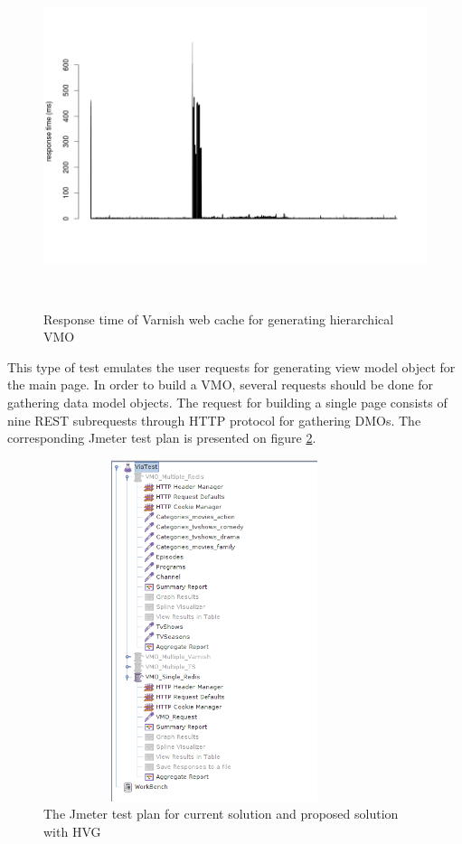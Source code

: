 \begin{figure}[h!]
    \centering
    \includegraphics[width=15cm,height=10cm,keepaspectratio]{images/vmo_varnish_mult.png}
    \caption{Response time of Varnish web cache for generating hierarchical VMO}
    \label{fig:vmo_varnish_mult}
\end{figure}

This type of test emulates the user requests for generating view model object for the main page. In order to build a VMO, several requests should be done for gathering data model objects. The request for building a single page consists of nine REST subrequests through HTTP protocol for gathering DMOs. The corresponding Jmeter test plan is presented on figure \ref{fig:vmo_testplan}.

\begin{figure}[h!]
    \centering
    \includegraphics[width=10cm,height=10cm,keepaspectratio]{images/vmo_testplan.png}
    \caption{The Jmeter test plan for current solution and proposed solution with HVG}
    \label{fig:vmo_testplan}
\end{figure}

